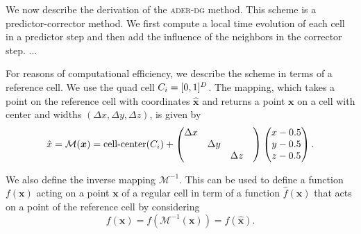 We now describe the derivation of the \textsc{ader-dg} method.
This scheme is a predictor-corrector method.
We first compute a local time evolution of each cell in a predictor step and then add the influence of the neighbors in the corrector step.
$\ldots$


\newcommand{\mapping}{\mathcal{M}}
\newcommand{\volume}{V}
For reasons of computational efficiency, we describe the scheme in terms of a reference cell.
We use the quad cell $C_{i} = [0, 1]^D$.
The mapping, which takes a point on the reference cell with coordinates $\hat{\bm{x}}$ and returns a point $\bm{x}$ on a cell with center and widths $(\Delta x, \Delta y, \Delta z)$, is given by
\begin{equation}\label{eq:space-mapping}
  \hat{x} = \mapping (\bm{x}) =
  \operatorname{cell-center}(\cell) +
\begin{pmatrix}
\Delta x && \\
&\Delta y & \\
&&\Delta z&
\end{pmatrix}
  \begin{pmatrix}
    x - 0.5\\
    y - 0.5\\
    z - 0.5
  \end{pmatrix}.
\end{equation}

We also define the inverse mapping $\mapping^{-1}$.
This can be used to define a function $f(\bm{x})$ acting on a point $\bm{x}$ of a regular cell in term of a function $\hat{f}(\bm{x})$ that acts on a point of the reference cell by considering
\begin{equation}
  \label{eq:function-ref-cell}
  f(\bm{x}) = f\left( \mapping^{-1}(\bm{x}) \right) = \hat{f}(\hat{\bm{x}}).
\end{equation}

